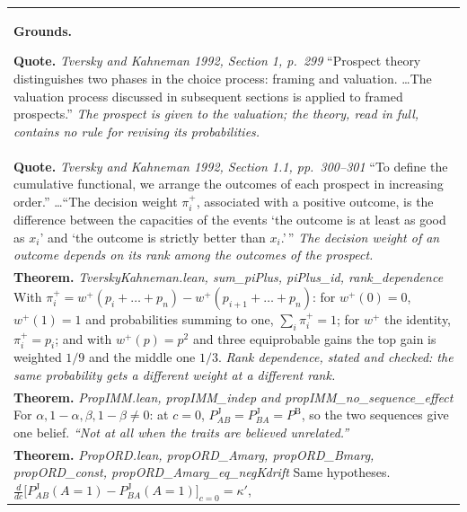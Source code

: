 \documentclass[10pt]{article}
\theoremstyle{definition}
\newcommand{\PB}{P^{\mathrm{B}}}
\newcommand{\PJ}{P^{\mathrm{J}}}
\newlength{\fullw}\setlength{\fullw}{25.9cm}
\begin{document}
{\begin{longtable}{|p{0.9cm}|p{12.2cm}|p{12.2cm}|}
\multicolumn{3}{|p{\fullw}|}{\textbf{Grounds.}\par \textbf{Quote.} \textit{Tversky and Kahneman 1992, Section 1, p.~299} \newline ``Prospect theory distinguishes two phases in the choice process: framing and
valuation. \ldots The valuation process discussed in subsequent sections is applied to
framed prospects.'' \newline \textit{The prospect is given to the valuation; the theory, read in full, contains no rule for revising its probabilities.}} \\
\multicolumn{3}{|p{\fullw}|}{\textbf{Quote.} \textit{Tversky and Kahneman 1992, Section 1.1, pp.~300--301} \newline ``To define the cumulative functional, we arrange the outcomes of each prospect in
increasing order.'' \ldots ``The decision weight $\pi_i^+$, associated with a positive outcome,
is the difference between the capacities of the events `the outcome is at least as good as
$x_i$' and `the outcome is strictly better than $x_i$.'\,'' \newline \textit{The decision weight of an outcome depends on its rank among the outcomes of the prospect.}} \\
\multicolumn{3}{|p{\fullw}|}{\textbf{Theorem.} \textit{TverskyKahneman.lean, sum\_piPlus, piPlus\_id, rank\_dependence} \newline With $\pi_i^+=w^+(p_i+\dots+p_n)-w^+(p_{i+1}+\dots+p_n)$: for $w^+(0)=0$, $w^+(1)=1$ and
probabilities summing to one, $\sum_i\pi_i^+=1$; for $w^+$ the identity, $\pi_i^+=p_i$; and with
$w^+(p)=p^2$ and three equiprobable gains the top gain is weighted $1/9$ and the middle one $1/3$. \newline \textit{Rank dependence, stated and checked: the same probability gets a different weight at a different rank.}} \\
\multicolumn{3}{|p{\fullw}|}{\textbf{Theorem.} \textit{PropIMM.lean, propIMM\_indep and propIMM\_no\_sequence\_effect} \newline For $\alpha,1-\alpha,\beta,1-\beta\neq0$: at $c=0$, $\PJ_{AB}=\PJ_{BA}=\PB$, so the two
sequences give one belief. \newline \textit{``Not at all when the traits are believed unrelated.''}} \\
\multicolumn{3}{|p{\fullw}|}{\textbf{Theorem.} \textit{PropORD.lean, propORD\_Amarg, propORD\_Bmarg, propORD\_const, propORD\_Amarg\_eq\_negKdrift} \newline Same hypotheses. $\frac{d}{dc}\bigl[\PJ_{AB}(A{=}1)-\PJ_{BA}(A{=}1)\bigr]_{c=0}=\kappa'$,
}
\end{longtable}}
\end{document}
